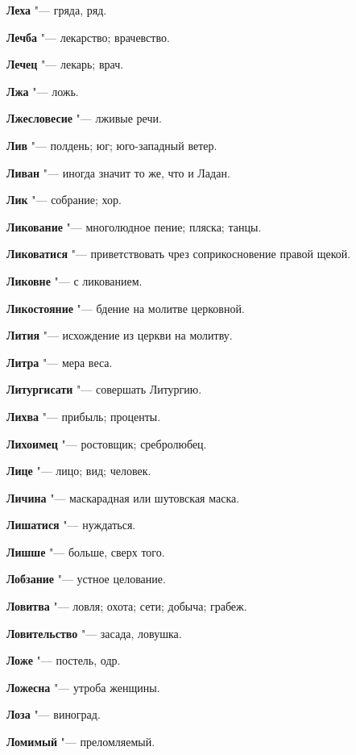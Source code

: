 \begin{mymulticols}
\noindent\textbf{Леха} "--- гряда, ряд. 

\noindent\textbf{Лечба} "--- лекарство; врачевство. 

\noindent\textbf{Лечец} "--- лекарь; врач. 

\noindent\textbf{Лжа} "--- ложь. 

\noindent\textbf{Лжесловесие} "--- лживые речи. 

\noindent\textbf{Лив} "--- полдень; юг; юго-западный ветер. 

\noindent\textbf{Ливан} "--- иногда значит то же, что и Ладан. 

\noindent\textbf{Лик} "--- собрание; хор. 

\noindent\textbf{Ликование} "--- многолюдное пение; пляска; танцы. 

\noindent\textbf{Ликоватися} "--- приветствовать чрез соприкосновение правой щекой. 

\noindent\textbf{Ликовне} "--- с ликованием. 

\noindent\textbf{Ликостояние} "--- бдение на молитве церковной. 

\noindent\textbf{Лития} "--- исхождение из церкви на молитву. 

\noindent\textbf{Литра} "--- мера веса. 

\noindent\textbf{Литургисати} "--- совершать Литургию. 

\noindent\textbf{Лихва} "--- прибыль; проценты. 

\noindent\textbf{Лихоимец} "--- ростовщик; сребролюбец. 

\noindent\textbf{Лице} "--- лицо; вид; человек. 

\noindent\textbf{Личина} "--- маскарадная или шутовская маска. 

\noindent\textbf{Лишатися} "--- нуждаться. 

\noindent\textbf{Лишше} "--- больше, сверх того. 

\noindent\textbf{Лобзание} "--- устное целование. 

\noindent\textbf{Ловитва} "--- ловля; охота; сети; добыча; грабеж. 

\noindent\textbf{Ловительство} "--- засада, ловушка. 

\noindent\textbf{Ложе} "--- постель, одр. 

\noindent\textbf{Ложесна} "--- утроба женщины. 

\noindent\textbf{Лоза} "--- виноград. 

\noindent\textbf{Ломимый} "--- преломляемый. 


\end{mymulticols}
